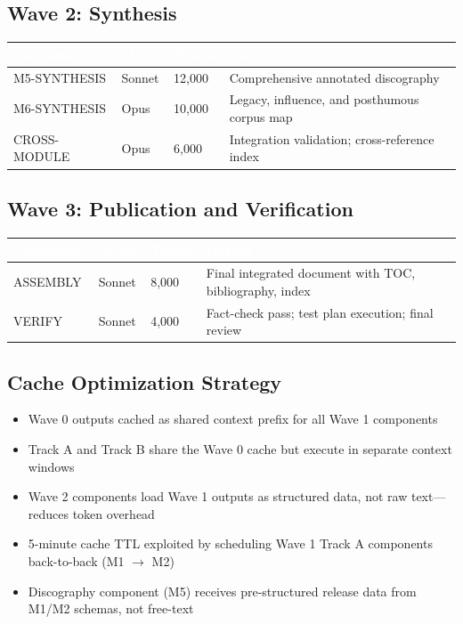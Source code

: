 \documentclass[11pt,letterpaper]{article}
\newcommand{\tableheader}[1]{\textbf{\sffamily\textcolor{white}{#1}}}
\begin{document}
\subsection{Wave 2: Synthesis}

\begin{center}
\begin{tabularx}{\textwidth}{L{3cm}C{1.5cm}C{1.5cm}X}
\toprule
{}
\tableheader{Component} & \tableheader{Model} & \tableheader{Tokens} & \tableheader{Output} \\
\midrule
M5-SYNTHESIS & Sonnet & 12,000 & Comprehensive annotated discography \\
M6-SYNTHESIS & Opus & 10,000 & Legacy, influence, and posthumous corpus map \\
CROSS-MODULE & Opus & 6,000 & Integration validation; cross-reference index \\
\bottomrule
\end{tabularx}
\end{center}

\subsection{Wave 3: Publication and Verification}

\begin{center}
\begin{tabularx}{\textwidth}{L{3cm}C{1.5cm}C{1.5cm}X}
\toprule
{}
\tableheader{Component} & \tableheader{Model} & \tableheader{Tokens} & \tableheader{Output} \\
\midrule
ASSEMBLY & Sonnet & 8,000 & Final integrated document with TOC, bibliography, index \\
VERIFY & Sonnet & 4,000 & Fact-check pass; test plan execution; final review \\
\bottomrule
\end{tabularx}
\end{center}

\subsection{Cache Optimization Strategy}

\begin{itemize}[leftmargin=2em]
\item Wave 0 outputs cached as shared context prefix for all Wave 1 components
\item Track A and Track B share the Wave 0 cache but execute in separate context windows
\item Wave 2 components load Wave 1 outputs as structured data, not raw text---reduces token overhead
\item 5-minute cache TTL exploited by scheduling Wave 1 Track A components back-to-back (M1 $\rightarrow$ M2)
\item Discography component (M5) receives pre-structured release data from M1/M2 schemas, not free-text
\end{itemize}
\end{document}
